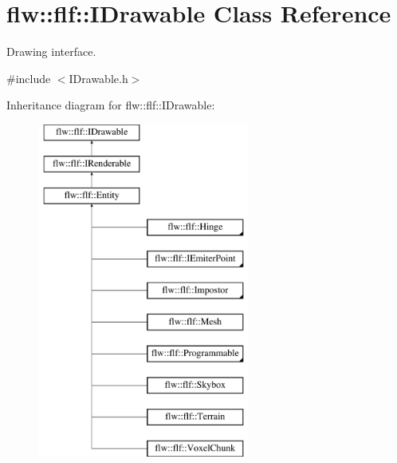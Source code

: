 \hypertarget{classflw_1_1flf_1_1IDrawable}{}\section{flw\+:\+:flf\+:\+:I\+Drawable Class Reference}
\label{classflw_1_1flf_1_1IDrawable}


Drawing interface.  




{\ttfamily \#include $<$I\+Drawable.\+h$>$}

Inheritance diagram for flw\+:\+:flf\+:\+:I\+Drawable\+:\begin{figure}[H]
\begin{center}
\leavevmode
\includegraphics[height=11.000000cm]{classflw_1_1flf_1_1IDrawable}
\end{center}
\end{figure}
